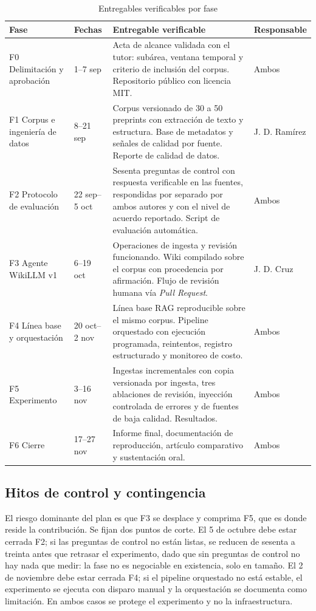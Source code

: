 \documentclass[11pt,letterpaper]{article}
\begin{document}
\begin{table}[htbp]
\centering
\caption{Entregables verificables por fase}
\label{tab:fases}
\begin{tabular}{L{3.0cm} L{2.0cm} L{7.2cm} L{2.2cm}}
\toprule
\textbf{Fase} & \textbf{Fechas} & \textbf{Entregable verificable} & \textbf{Responsable} \\
\midrule
F0 Delimitación y aprobación & 1--7 sep & Acta de alcance validada con el tutor: subárea, ventana temporal y criterio de inclusión del corpus. Repositorio público con licencia MIT. & Ambos \\
F1 Corpus e ingeniería de datos & 8--21 sep & Corpus versionado de 30 a 50 preprints con extracción de texto y estructura. Base de metadatos y señales de calidad por fuente. Reporte de calidad de datos. & J. D. Ramírez \\
F2 Protocolo de evaluación & 22 sep--5 oct & Sesenta preguntas de control con respuesta verificable en las fuentes, respondidas por separado por ambos autores y con el nivel de acuerdo reportado. Script de evaluación automática. & Ambos \\
F3 Agente WikiLLM v1 & 6--19 oct & Operaciones de ingesta y revisión funcionando. Wiki compilado sobre el corpus con procedencia por afirmación. Flujo de revisión humana vía \textit{Pull Request}. & J. D. Cruz \\
F4 Línea base y orquestación & 20 oct--2 nov & Línea base RAG reproducible sobre el mismo corpus. Pipeline orquestado con ejecución programada, reintentos, registro estructurado y monitoreo de costo. & Ambos \\
F5 Experimento & 3--16 nov & Ingestas incrementales con copia versionada por ingesta, tres ablaciones de revisión, inyección controlada de errores y de fuentes de baja calidad. Resultados. & Ambos \\
F6 Cierre & 17--27 nov & Informe final, documentación de reproducción, artículo comparativo y sustentación oral. & Ambos \\
\bottomrule
\end{tabular}
\end{table}

\subsection{Hitos de control y contingencia}

El riesgo dominante del plan es que F3 se desplace y comprima F5, que es donde reside la
contribución. Se fijan dos puntos de corte. El 5 de octubre debe estar cerrada F2; si las preguntas de
control no están listas, se reducen de sesenta a treinta antes que retrasar el experimento, dado que
sin preguntas de control no hay nada que medir: la fase no es negociable en existencia, solo en
tamaño. El 2 de noviembre debe estar cerrada F4; si el pipeline orquestado no está estable, el
experimento se ejecuta con disparo manual y la orquestación se documenta como limitación. En ambos
casos se protege el experimento y no la infraestructura.
\end{document}
